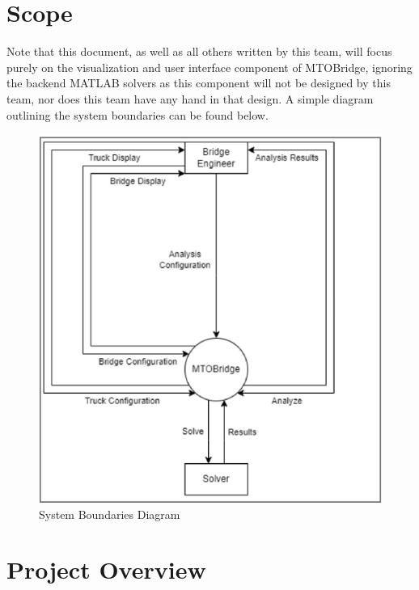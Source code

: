 \documentclass[12pt, titlepage]{article}
\begin{document}
\section{Scope}
Note that this document, as well as all others written by this team, will focus purely on the visualization and user interface component of MTOBridge, ignoring the backend MATLAB solvers as this component will not be designed by this team, nor does this team have any hand in that design. A simple diagram outlining the system boundaries can be found below.
\begin{figure}[H]
  \includegraphics[]{../images/system-boundaries.PNG}
  \caption{System Boundaries Diagram}
  \label{fig:system-boundaries-diagram}
\end{figure}

\section{Project Overview}
\end{document}
